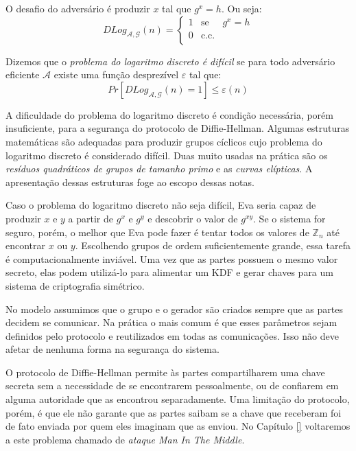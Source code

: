 O desafio do adversário é produzir $x$ tal que $g^x = h$.
Ou seja:
\begin{displaymath}
  DLog_{\mathcal{A}, \mathcal{G}}(n) = \left\{
    \begin{array}{lcl}
      1 & \textrm{se} & g^x = h\\
      0 & \textrm{c.c.} &\\
    \end{array}
    \right.
\end{displaymath}

Dizemos que o {\em problema do logaritmo discreto é difícil} se para todo adversário eficiente $\mathcal{A}$ existe uma função desprezível $\varepsilon$ tal que:
\begin{displaymath}
  Pr[DLog_{\mathcal{A}, \mathcal{G}}(n) = 1] \leq \varepsilon(n)
\end{displaymath}

A dificuldade do problema do logaritmo discreto é condição necessária, porém insuficiente, para a segurança do protocolo de Diffie-Hellman.
Algumas estruturas matemáticas são adequadas para produzir grupos cíclicos cujo problema do logaritmo discreto é considerado difícil.
Duas muito usadas na prática são os {\em resíduos quadráticos de grupos de tamanho primo} e as {\em curvas elípticas}.
A apresentação dessas estruturas foge ao escopo dessas notas.


Caso o problema do logaritmo discreto não seja difícil, Eva seria capaz de produzir $x$ e $y$ a partir de $g^x$ e $g^y$ e descobrir o valor de $g^{xy}$.
Se o sistema for seguro, porém, o melhor que Eva pode fazer é tentar todos os valores de $\mathbb{Z}_n$ até encontrar $x$ ou $y$.
Escolhendo grupos de ordem suficientemente grande, essa tarefa é computacionalmente inviável.
Uma vez que as partes possuem o mesmo valor secreto, elas podem utilizá-lo para alimentar um KDF e gerar chaves para um sistema de criptografia simétrico.

No modelo assumimos que o grupo e o gerador são criados sempre que as partes decidem se comunicar.
Na prática o mais comum é que esses parâmetros sejam definidos pelo protocolo e reutilizados em todas as comunicações.
Isso não deve afetar de nenhuma forma na segurança do sistema.

O protocolo de Diffie-Hellman permite às partes compartilharem uma chave secreta sem a necessidade de se encontrarem pessoalmente, ou de confiarem em alguma autoridade que as encontrou separadamente.
Uma limitação do protocolo, porém, é que ele não garante que as partes saibam se a chave que receberam foi de fato enviada por quem eles imaginam que as enviou.
No Capítulo \ref{} voltaremos a este problema chamado de {\em ataque Man In The Middle}.


